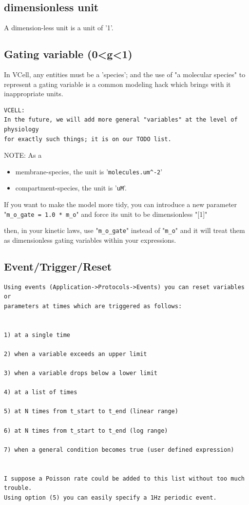 \subsection{dimensionless unit}

A dimension-less unit is a unit of '1'.


\subsection{Gating variable (0<g<1)}

In VCell, any entities must be a 'species'; and the use of "a molecular species"
to represent a gating variable is a common modeling hack which brings with it
inappropriate units.

\begin{verbatim}
VCELL:
In the future, we will add more general "variables" at the level of physiology
for exactly such things; it is on our TODO list. 
\end{verbatim}

NOTE: As a 
\begin{itemize}
  \item  membrane-species, the unit is '\verb!molecules.um^-2!'
  \item compartment-species, the unit is '\verb!uM!'.
\end{itemize}

If you want to make the model more tidy, you can introduce a new parameter
"\verb!m_o_gate = 1.0 * m_o!" and force its unit to be dimensionless "[1]"

then, in your kinetic laws, use "\verb!m_o_gate!" instead of "\verb!m_o!" and it
will treat them as dimensionless gating variables within your expressions.





\subsection{Event/Trigger/Reset}

\begin{verbatim}
Using events (Application->Protocols->Events) you can reset variables or
parameters at times which are triggered as follows: 


1) at a single time 

2) when a variable exceeds an upper limit

3) when a variable drops below a lower limit

4) at a list of times

5) at N times from t_start to t_end (linear range)

6) at N times from t_start to t_end (log range)

7) when a general condition becomes true (user defined expression)


I suppose a Poisson rate could be added to this list without too much trouble. 
Using option (5) you can easily specify a 1Hz periodic event. 
\end{verbatim}



